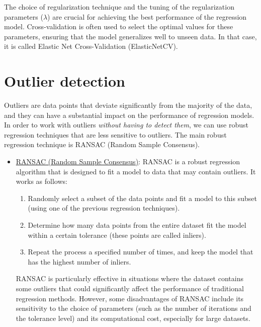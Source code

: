 \begin{itemize}
    \begin{observacion}
        The choice of regularization technique and the tuning of the regularization parameters ($\lambda$) are crucial for achieving the best performance of the regression model. Cross-validation is often used to select the optimal values for these parameters, ensuring that the model generalizes well to unseen data. In that case, it is called Elastic Net Cross-Validation (ElasticNetCV).
    \end{observacion}
\end{itemize}

\section{Outlier detection}


Outliers are data points that deviate significantly from the majority of the data, and they can have a substantial impact on the performance of regression models. In order to work with outliers \emph{without having to detect them}, we can use robust regression techniques that are less sensitive to outliers. The main robust regression technique is RANSAC (Random Sample Consensus).
\begin{itemize}
    \item \ul{RANSAC (Random Sample Consensus)}: RANSAC is a robust regression algorithm that is designed to fit a model to data that may contain outliers. It works as follows:
    \begin{enumerate}
        \item Randomly select a subset of the data points and fit a model to this subset (using one of the previous regression techniques).
        \item Determine how many data points from the entire dataset fit the model within a certain tolerance (these points are called inliers).
        \item Repeat the process a specified number of times, and keep the model that has the highest number of inliers.
    \end{enumerate}

    RANSAC is particularly effective in situations where the dataset contains some outliers that could significantly affect the performance of traditional regression methods. However, some disadvantages of RANSAC include its sensitivity to the choice of parameters (such as the number of iterations and the tolerance level) and its computational cost, especially for large datasets.
\end{itemize}

